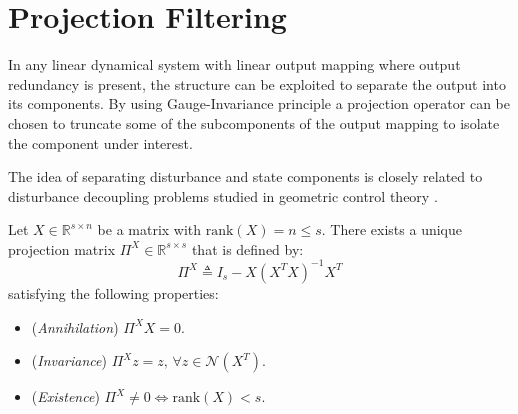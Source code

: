 \section{Projection Filtering}
In any linear dynamical system with linear output mapping where output redundancy is present, the structure can be exploited to separate the output into its components. By using Gauge-Invariance principle a projection operator can be chosen to truncate some of the subcomponents of the output mapping to isolate the component under interest. 

The idea of separating disturbance and state components is closely related to disturbance decoupling problems studied in geometric control theory \cite{BasileMarro1992}.

\begin{theorem}%
Let $X\in \mathbb{R}^{s\times n}$ be a matrix with $\mathrm{rank}(X)=n\leq s$. There exists a unique projection matrix $\Pi^X\in\mathbb{R}^{s\times s}$ that is defined by:
\begin{equation*}
    \Pi^X\triangleq I_s-X{(X^T X)}^{-1}X^T \label{eq:projection}
\end{equation*}
satisfying the following properties:
\begin{itemize}
    \item (\textit{Annihilation}) $\Pi^X X=0$.
    \item (\textit{Invariance}) $\Pi^X z=z,\,\forall z\in\mathcal{N}(X^T)$.
    \item (\textit{Existence}) $\Pi^X \neq 0 \iff \mathrm{rank}(X)<s$.
\end{itemize}
\end{theorem}
